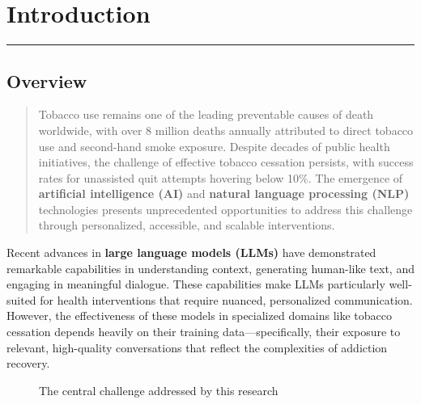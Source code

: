 \chapter{Introduction} %

\label{Chapter1} %


\begin{center}
\rule{0.5\textwidth}{0.5pt}
\end{center}

\section{Overview}
\begin{quotation}
\noindent Tobacco use remains one of the leading preventable causes of death worldwide, with over 8 million deaths annually attributed to direct tobacco use and second-hand smoke exposure. Despite decades of public health initiatives, the challenge of effective tobacco cessation persists, with success rates for unassisted quit attempts hovering below 10\%. The emergence of \textbf{artificial intelligence (AI)} and \textbf{natural language processing (NLP)} technologies presents unprecedented opportunities to address this challenge through personalized, accessible, and scalable interventions.
\end{quotation}

Recent advances in \textbf{large language models (LLMs)} have demonstrated remarkable capabilities in understanding context, generating human-like text, and engaging in meaningful dialogue. These capabilities make LLMs particularly well-suited for health interventions that require nuanced, personalized communication. However, the effectiveness of these models in specialized domains like tobacco cessation depends heavily on their training data—specifically, their exposure to relevant, high-quality conversations that reflect the complexities of addiction recovery.

\begin{figure}[h]
\centering
{}
\caption{The central challenge addressed by this research}
\label{fig:data-scarcity}
\end{figure}

